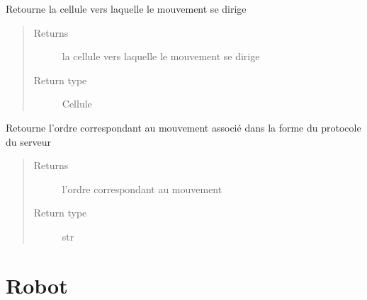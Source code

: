 \documentclass[letterpaper,10pt,english]{sphinxmanual}
\begin{document}
\begin{fulllineitems}
\begin{fulllineitems}
\begin{quote}
\begin{description}
\end{description}\end{quote}

\end{fulllineitems}


\begin{fulllineitems}
\label{index:Mouvement.Mouvement.toCellule}
Retourne la cellule vers laquelle le mouvement se dirige
\begin{quote}\begin{description}
\item[{Returns}] \leavevmode
la cellule vers laquelle le mouvement se dirige

\item[{Return type}] \leavevmode
Cellule

\end{description}\end{quote}

\end{fulllineitems}


\begin{fulllineitems}
\label{index:Mouvement.Mouvement.toOrder}
Retourne l'ordre correspondant au mouvement associé dans la forme du protocole du serveur
\begin{quote}\begin{description}
\item[{Returns}] \leavevmode
l'ordre correspondant au mouvement

\item[{Return type}] \leavevmode
str

\end{description}\end{quote}

\end{fulllineitems}


\end{fulllineitems}



\chapter{Robot}
\label{index:module-Robot}\label{index:robot}
\end{document}
